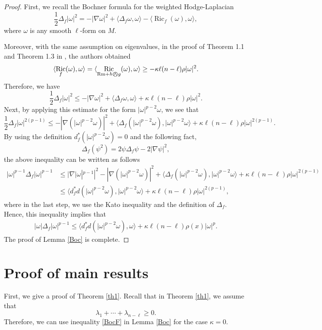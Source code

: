 \documentclass[leqno,12pt]{article} %
\theoremstyle{plain} %
\theoremstyle{definition} %
\numberwithin{equation}{section}
\newcommand{\KN}{\mathbin{\bigcirc\mspace{-15mu}\wedge\mspace{3mu}}}
\DeclareMathOperator{\Ric}{Ric}
\begin{document}
\begin{proof}
	First, we recall the Bochner formula for the weighted Hodge-Laplacian
	$$\frac{1}{2}\Delta_f |\omega|^2=-|\nabla \omega|^2 + \langle \Delta_f \omega, \omega \rangle- \langle \Ric_f (\omega), \omega \rangle,$$
	where $\omega$ is any smooth $\ell$-form on $M$.
	
	Moreover, with the same assumption on eigenvalues, in the proof of Theorem 1.1 and Theorem 1.3 in \cite{DDH25}, the authors obtained 
	$$ \langle \Ric_f (\omega), \omega \rangle= \langle \Ric_{\mathrm{Rm}+h \KN g} (\omega), \omega \rangle \ge -\kappa \ell (n-\ell)\rho |\omega|^2 .$$
	Therefore, we have $$\frac{1}{2}\Delta_f |\omega|^2\le-|\nabla \omega|^2 + \langle \Delta_f \omega, \omega \rangle +\kappa \ell (n-\ell)\rho |\omega|^2.$$
	Next, by applying this estimate for the form $|\omega|^{p-2}\omega$, we see that
	$$\frac{1}{2}\Delta_f |\omega|^{2(p-1)}\le-|\nabla (|\omega|^{p-2}\omega)|^2 +  \langle \Delta_f (|\omega|^{p-2}\omega), |\omega|^{p-2}\omega \rangle +\kappa \ell (n-\ell)\rho |\omega|^{2(p-1)}.$$
	By using the definition $d^*_f(|\omega|^{p-2}\omega)=0$ and the following fact, $$\Delta_f(\psi ^2) = 2 \psi \Delta_f \psi -2|\nabla \psi|^2,$$ 
    the above inequality can be written as follows
	\begin{align*}\nonumber
		|\omega|^{p-1}\Delta_f|\omega|^{p-1} 
&	\le |\nabla |\omega|^{p-1}|^2{-} |\nabla(|\omega|^{p-2}\omega)|^2 + \langle \Delta_f (|\omega|^{p-2}\omega), |\omega|^{p-2}\omega \rangle +\kappa \ell (n{-}\ell)\rho |\omega|^{2(p-1)}\\\nonumber
&\le \langle d^*_f d (|\omega|^{p-2}\omega), |\omega|^{p-2}\omega \rangle +\kappa \ell (n-\ell)\rho |\omega|^{2(p-1)},
	\end{align*}
	where in the last step, we use the Kato inequality and the definition of $\Delta_f$.
	Hence, this inequality implies that
	\begin{align*}
	|\omega| \Delta_f |\omega|^{p-1} \le \langle d^*_f d (|\omega|^{p-2}\omega), \omega \rangle +\kappa \ell (n-\ell) \rho(x)|\omega|^p.
\end{align*}
The proof of Lemma \ref{Boc} is complete.
\end{proof}



\section{Proof of main results}

First, we give a proof of Theorem \ref{th1}. Recall that in Theorem \ref{th1}, we assume that $$\lambda_1+\cdots+\lambda_{n-\ell}\ge 0	.$$ Therefore, we can use inequality \eqref{BocF} in Lemma \ref{Boc}  for the case $\kappa=0$.
\end{document}
